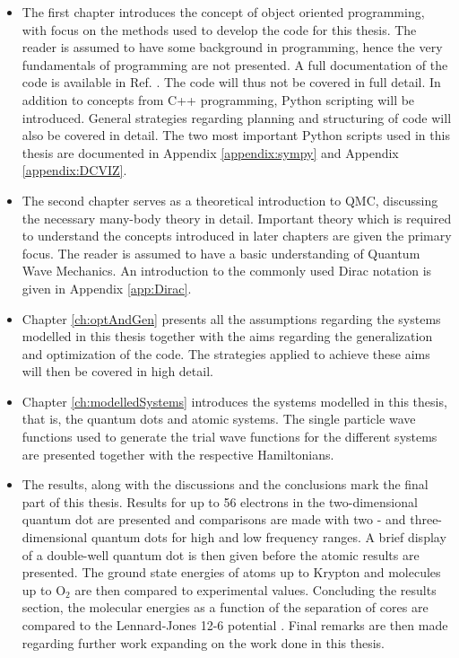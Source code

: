 \begin{itemize}
 \item The first chapter introduces the concept of object oriented programming, with focus on the methods used to develop the code for this thesis. The reader is assumed to have some background in programming, hence the very fundamentals of programming are not presented. A full documentation of the code is available in Ref. \cite{libBorealisCode}. The code will thus not be covered in full detail. In addition to concepts from C++ programming, Python scripting will be introduced. General strategies regarding planning and structuring of code will also be covered in detail. The two most important Python scripts used in this thesis are documented in Appendix \ref{appendix:sympy} and Appendix \ref{appendix:DCVIZ}.
 
 \item The second chapter serves as a theoretical introduction to QMC, discussing the necessary many-body theory in detail. Important theory which is required to understand the concepts introduced in later chapters are given the primary focus. The reader is assumed to have a basic understanding of Quantum Wave Mechanics. An introduction to the commonly used Dirac notation is given in Appendix \ref{app:Dirac}.
 
 \item Chapter \ref{ch:optAndGen} presents all the assumptions regarding the systems modelled in this thesis together with the aims regarding the generalization and optimization of the code. The strategies applied to achieve these aims will then be covered in high detail.
 
 \item Chapter \ref{ch:modelledSystems} introduces the systems modelled in this thesis, that is, the quantum dots and atomic systems. The single particle wave functions used to generate the trial wave functions for the different systems are presented together with the respective Hamiltonians.
 
 \item The results, along with the discussions and the conclusions mark the final part of this thesis. Results for up to 56 electrons in the two-dimensional quantum dot are presented and comparisons are made with two - and three-dimensional quantum dots for high and low frequency ranges. A brief display of a double-well quantum dot is then given before the atomic results are presented. The ground state energies of atoms up to Krypton and molecules up to $\mathrm{O_2}$ are then compared to experimental values. Concluding the results section, the molecular energies as a function of the separation of cores are compared to the Lennard-Jones 12-6 potential \cite{MD1, MD2}. Final remarks are then made regarding further work expanding on the work done in this thesis. 
\end{itemize}